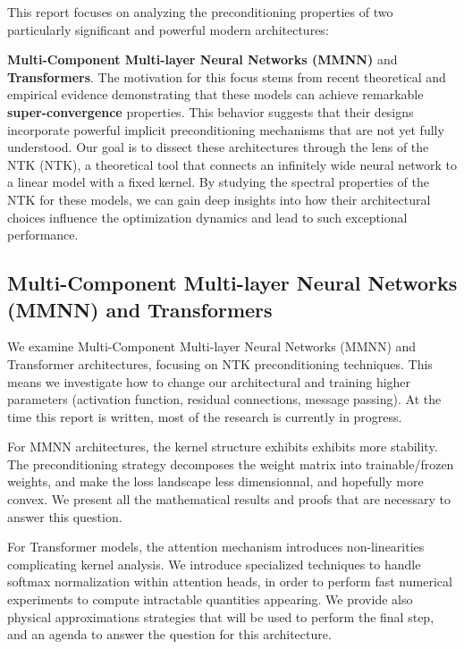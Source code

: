 \documentclass[a4paper]{article}
\theoremstyle{plain}
\theoremstyle{definition}
\theoremstyle{remark}
\begin{document}
This report focuses on analyzing the preconditioning properties of two particularly significant and powerful modern architectures: 


\textbf{Multi-Component Multi-layer Neural Networks (MMNN)} and \textbf{Transformers}. 
The motivation for this focus stems from recent theoretical and empirical evidence demonstrating that these models can achieve
 remarkable \textbf{super-convergence} properties. This behavior suggests that their designs incorporate powerful implicit 
 preconditioning mechanisms that are not yet fully understood. Our goal is to dissect these architectures through the lens 
 of the NTK (NTK), a theoretical tool that connects an infinitely wide neural network to a linear model
  with a fixed kernel. By studying the spectral properties of the NTK for these models, we can gain deep insights into how
   their architectural choices influence the optimization dynamics and lead to such exceptional performance.



\subsection{Multi-Component Multi-layer Neural Networks (MMNN) and Transformers}

We examine Multi-Component Multi-layer Neural Networks (MMNN) and Transformer architectures, focusing on NTK preconditioning techniques. This means we investigate how to change our architectural
and training higher parameters (activation function, residual connections, message passing). At the time this report is written, most of the research is currently in progress.

For MMNN architectures, the kernel structure exhibits exhibits more stability. The preconditioning strategy decomposes the weight matrix into trainable/frozen weights,
and make the loss landscape less dimensionnal, and hopefully more convex. We present all the mathematical results and proofs
that are necessary to answer this question.

For Transformer models, the attention mechanism introduces non-linearities complicating kernel analysis. 
We introduce specialized techniques to handle softmax normalization within attention heads, in order to perform fast numerical experiments to compute
intractable quantities appearing. We provide also physical approximations strategies that will be used to perform the final step, and an agenda
to answer the question for this architecture.
\end{document}
